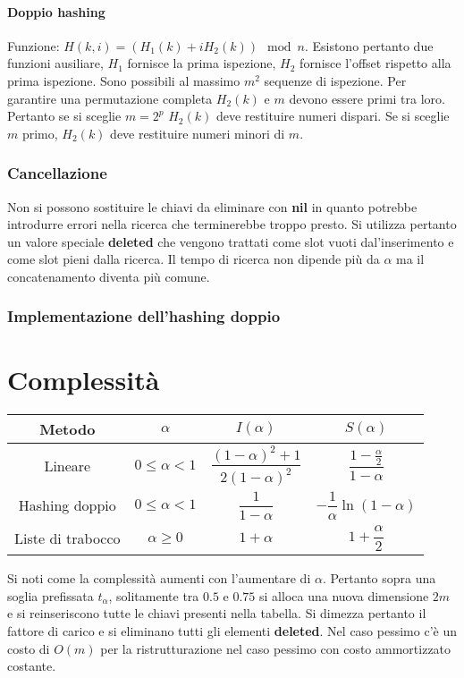 \paragraph{Doppio hashing}
Funzione: $H(k, i)=(H_1(k)+ iH_2(k))\mod n$. Esistono pertanto due funzioni ausiliare, $H_1$ fornisce la prima ispezione, $H_2$ fornisce l'offset rispetto
alla prima ispezione. Sono possibili al massimo $m^2$ sequenze di ispezione. Per garantire una permutazione completa $H_2(k)$ e $m$ devono essere primi tra
loro. Pertanto se si sceglie $m=2^p$ $H_2(k)$ deve restituire numeri dispari. Se si sceglie $m$ primo, $H_2(k)$ deve restituire numeri minori di $m$.
\subsubsection{Cancellazione}
Non si possono sostituire le chiavi da eliminare con \textbf{nil} in quanto potrebbe introdurre errori nella ricerca che terminerebbe troppo presto. Si
utilizza pertanto un valore speciale \textbf{deleted} che vengono trattati come slot vuoti dal'inserimento e come slot pieni dalla ricerca. Il tempo di
ricerca non dipende pi\`u da $\alpha$ ma il concatenamento diventa pi\`u comune.
\newpage
\subsubsection{Implementazione dell'hashing doppio}

\section{Complessit\`a}
\begin{center}
    \begin{tabular}{|c|c|c|c|}
        \hline
        \textbf{Metodo}   & $\alpha$        & $I(\alpha)$                             & $S(\alpha)$                            \\
        \hline
        Lineare           & $0\le\alpha< 1$ & $\dfrac{(1-\alpha)^2+1}{2(1-\alpha)^2}$ & $\dfrac{1-\frac{\alpha}{2}}{1-\alpha}$ \\
        \hline
        Hashing doppio    & $0\le\alpha< 1$ & $\dfrac{1}{1-\alpha}$                   & $-\dfrac{1}{\alpha}\ln(1-\alpha)$      \\
        \hline
        Liste di trabocco & $\alpha\ge 0$   & $1+\alpha$                              & $1+\dfrac{\alpha}{2}$                  \\
        \hline
    \end{tabular}
\end{center}
Si noti come la complessit\`a aumenti con l'aumentare di $\alpha$. Pertanto sopra una soglia prefissata $t_\alpha$, solitamente tra $0.5$ e $0.75$ si alloca
una nuova dimensione $2m$ e si reinseriscono tutte le chiavi presenti nella tabella. Si dimezza pertanto il fattore di carico e si eliminano tutti gli
elementi \textbf{deleted}. Nel caso pessimo c'\`e un costo di $O(m)$ per la ristrutturazione nel caso pessimo con costo ammortizzato costante.
